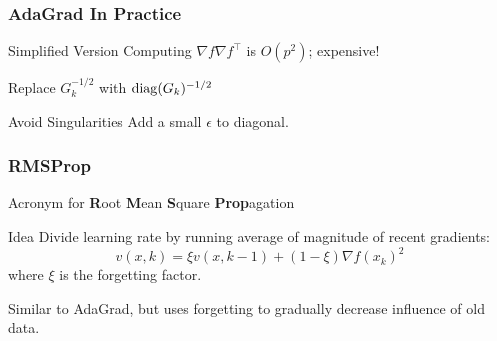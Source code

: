 \documentclass[aspectratio=1610,onlytextwidth]{beamer}
\begin{document}
\begin{frame}[c]
  \frametitle{AdaGrad In Practice}

  \begin{block}{Simplified Version}
    Computing \(\nabla f \nabla f^\intercal\) is \(O(p^2)\); expensive!

    \medskip

    Replace \(G^{-1/2}_k\) with \(\operatorname{diag}(G_k)^{-1/2}\)
  \end{block}

  \pause\bigskip

  \begin{block}{Avoid Singularities}
    Add a small \(\epsilon\) to diagonal.
  \end{block}

  \pause\bigskip

  \begin{algorithm}[H]
    \caption{Simplified AdaGrad}
  \end{algorithm}

\end{frame}

\begin{frame}[c]
  \frametitle{RMSProp}

  Acronym for \textbf{R}oot \textbf{M}ean \textbf{S}quare \textbf{Prop}agation~\parencite{hintonLecture62018}

  \begin{block}{Idea}
    Divide learning rate by running average of magnitude of recent gradients:
    \[
      v(x,k) = \xi v(x, k -1) + (1 - \xi)\nabla f(x_k)^2
    \]
    where \(\xi\) is the \alert{forgetting factor}.
  \end{block}

  \medskip

  Similar to AdaGrad, but uses \alert{forgetting} to gradually decrease influence of old data.

  \bigskip

  \begin{algorithm}[H]
    \For{$k \gets 1, 2, \dots$, $\xi \in [0, 1)$}{
    $v_k = \xi v_{k-1} + (1 - \xi) \nabla f(x_{k-1})$\;
    $x_k \gets x_{k-1} - \frac{\gamma}{\sqrt{v_k}} \odot \nabla f(x_{k-1})$\;
    }
    \caption{RMSProp}
  \end{algorithm}

\end{frame}
\end{document}
